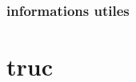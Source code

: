 \documentclass[../main.tex]{subfile}
\begin{document}
\section{informations utiles}
\part{truc}
\end{document}
